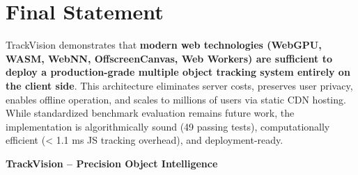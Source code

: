 \section{Final Statement}
\label{sec:final}

TrackVision demonstrates that \textbf{modern web technologies (WebGPU, WASM, WebNN, OffscreenCanvas, Web Workers) are sufficient to deploy a production-grade multiple object tracking system entirely on the client side}. This architecture eliminates server costs, preserves user privacy, enables offline operation, and scales to millions of users via static CDN hosting. While standardized benchmark evaluation remains future work, the implementation is algorithmically sound (49 passing tests), computationally efficient (< 1.1 ms JS tracking overhead), and deployment-ready.

\vspace{1cm}

\noindent \textbf{TrackVision -- Precision Object Intelligence}
